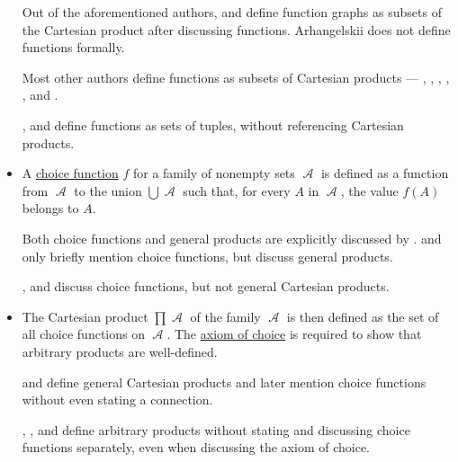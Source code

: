 \begin{remark}
\begin{itemize}
    Out of the aforementioned authors,  and  define function graphs as subsets of the Cartesian product after discussing functions. Arhangelskii does not define functions formally.

    Most other authors define functions as subsets of Cartesian products ---
    ,
    ,
    ,
    ,
    ,
     and
    .

    ,  and  define functions as sets of tuples, without referencing Cartesian products.

    \item A \hyperref[def:choice_function]{choice function} \( f \) for a family of nonempty sets \( \mscrA \) is defined as a function from \( \mscrA \) to the union \( \bigcup \mscrA \) such that, for every \( A \) in \( \mscrA \), the value \( f(A) \) belongs to \( A \).

    Both choice functions and general products are explicitly discussed by .  and  only briefly mention choice functions, but discuss general products.

    ,  and  discuss choice functions, but not general Cartesian products.

    \item The Cartesian product \( \prod \mscrA \) of the family \( \mscrA \) is then defined as the set of all choice functions on \( \mscrA \). The \hyperref[def:zfc/choice]{axiom of choice} is required to show that arbitrary products are well-defined.

     and  define general Cartesian products and later mention choice functions without even stating a connection.

    ,
    ,
     and
    define arbitrary products without stating and discussing choice functions separately, even when discussing the axiom of choice.


\end{itemize}
\end{remark}
